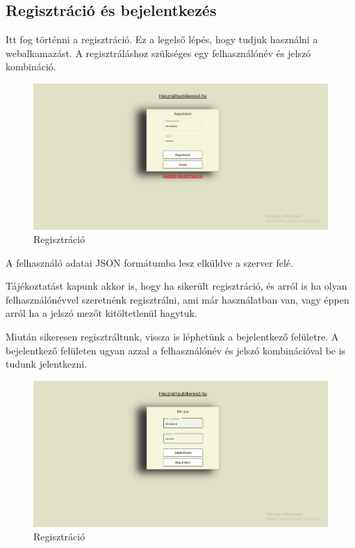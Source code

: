 
\subsection{Regisztráció és bejelentkezés}
Itt fog történni a regisztráció. Ez a legelső lépés, hogy tudjuk használni a webalkamazást.
A regisztráláshoz szükséges egy felhasználónév és jelszó kombináció.

\begin{figure}[h]
\centering
\includegraphics[scale=0.37]{images/regisztracio.png}
\caption{Regisztráció}
\label{fig:regisztracio}
\end{figure}

A felhasználó adatai JSON formátumba lesz elküldve a szerver felé.

Tájékoztatást kapunk akkor is, hogy ha sikerült regisztráció, és arról is ha olyan felhasználónévvel szeretnénk regisztrálni, ami már használatban van, vagy éppen arról ha a jelszó mezőt kitöltetlenül hagytuk.

Miután sikeresen regisztráltunk, vissza is léphetünk a bejelentkező felületre.
A bejelentkező felületen ugyan azzal a felhasználónév és jelszó kombinációval be is tudunk jelentkezni.

\begin{figure}[h]
\centering
\includegraphics[scale=0.37]{images/bejelentkezes.png}
\caption{Regisztráció}
\label{fig:regisztracio}
\end{figure}


